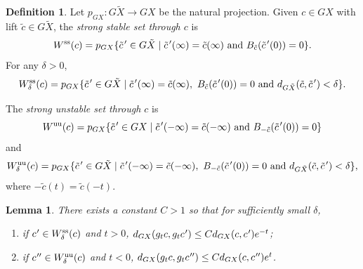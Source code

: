 \documentclass[11pt]{article}
\let\sep\mid
\newcommand{\cpr}{c\mkern1mu'}
\newcommand{\tcpr}{\tilde c\mkern2mu'}
\newcommand{\sts}{\mathrm{ss}}
\newcommand{\uu}{\mathrm{uu}}
\newtheorem{lem}[thm]{Lemma}
\theoremstyle{definition}
\newtheorem{defn}[thm]{Definition}
\numberwithin{equation}{section}
\begin{document}
\begin{defn}
Let $p_{GX}:G\tilde X \to GX$ be the natural projection. Given $c\in GX$ with lift $\tilde c\in G\tilde X$, the \emph{strong stable set through $c$} is
\[ W^{\sts}(c) = p_{GX}\{ \tcpr \in G\tilde X \sep \tcpr(\infty) = \tilde c(\infty) \mbox{ and } B_{\tilde c}(\tcpr(0)) = 0\}. \]
For any $\delta>0$,
\[ W^{\sts}_\delta(c) = p_{GX}\{ \tcpr \in G\tilde X \sep \tcpr(\infty) = \tilde c(\infty), \ B_{\tilde c}(\tcpr(0)) = 0 \mbox{ and } d_{G\tilde X}(\tilde c,\tcpr)<\delta \}. \]

The \emph{strong unstable set through $c$} is
\[W^{\uu}(c) = p_{GX}\{ \tcpr \in GX \sep \tcpr(-\infty) = \tilde c(-\infty) \mbox{ and } B_{-\tilde c}(\tcpr(0)) = 0\}\] and \[ W^{\uu}_\delta(c) = p_{GX}\{ \tcpr \in G\tilde X \sep \tcpr(-\infty) = \tilde c(-\infty), \ B_{-\tilde c}(\tcpr(0)) = 0 \mbox{ and } d_{G\tilde X}(\tilde c,\tcpr)<\delta \},\] where $-\tilde c(t) = \tilde c(-t)$.
\end{defn}

\begin{lem}\label{lem:contract}
There exists a constant $C>1$ so that for sufficiently small $\delta$,
\begin{enumerate}
\item if $\cpr \in W^{\sts}_\delta(c)$ and $t>0$, $d_{GX}(g_tc, g_t\cpr) \leq C d_{GX}(c, \cpr) e^{-t}$;
\item if $\cpr' \in W^{\uu}_\delta(c)$ and $t<0$, $d_{GX}(g_tc, g_t\cpr') \leq C d_{GX}(c, \cpr') e^{t}$.
\end{enumerate}
\end{lem}
\end{document}
